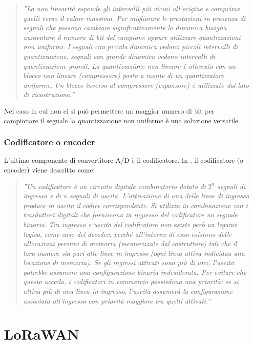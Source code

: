 \documentclass[a4paper]{report} %
\begin{document}
\begin{quote}
	\textit{''La non linearità espande gli intervalli più vicini all'origine e comprime quelli verso il valore massimo. Per migliorare le prestazioni in presenza di segnali che possono cambiare significativamente la dinamica bisogna aumentare il numero di bit del campione oppure utilizzare quantizzazioni non uniformi. I segnali con piccola dinamica vedono piccoli intervalli di quantizzazione, segnali con grande dinamica vedono intervalli di quantizzazione grandi. La quantizzazione non lineare è ottenuto con un blocco non lineare (compressore) posto a monte di un quantizzatore uniforme. Un blocco inverso al compressore (espansore) è utilizzato dal lato di ricostruzione.''} 
\end{quote}
Nel caso in cui non ci si può permettere un maggior numero di bit per campionare il segnale la quantizzazione non uniforme è una soluzione versatile.

\subsection{Codificatore o encoder}
L'ultimo componente di convertitore A/D è il codificatore. In \cite{art:rif.3}, il codificatore (o encoder) viene descritto come:
\begin{quote}
	\textit{''Un codificatore è un circuito digitale combinatorio dotato di $2^{n}$ segnali di ingresso e di $n$ segnali di uscita. L'attivazione di una delle linee di ingresso produce in uscita il codice corrispondente. Si utilizza in combinazione con i trasduttori digitali che forniscono in ingresso del codificatore un segnale binario. Tra ingresso e uscita del codificatore non esiste però un legame logico, come caso del decoder, perché all'interno di esso esistono delle allocazioni perenni di memoria (memorizzate dal costruttore) tali che il loro numero sia pari alle linee in ingresso (ogni linea attiva individua una locazione di memoria). Se gli ingressi attivati sono più di uno, l'uscita potrebbe assumere una configurazione binaria indesiderata. Per evitare che questo accada, i codificatori in commercio possiedono una priorità: se si attiva più di una linea in ingresso, l'uscita assumerà la configurazione associata all'ingresso con priorità maggiore tra quelli attivati.''} 
\end{quote}

\chapter{LoRaWAN}
\end{document}
